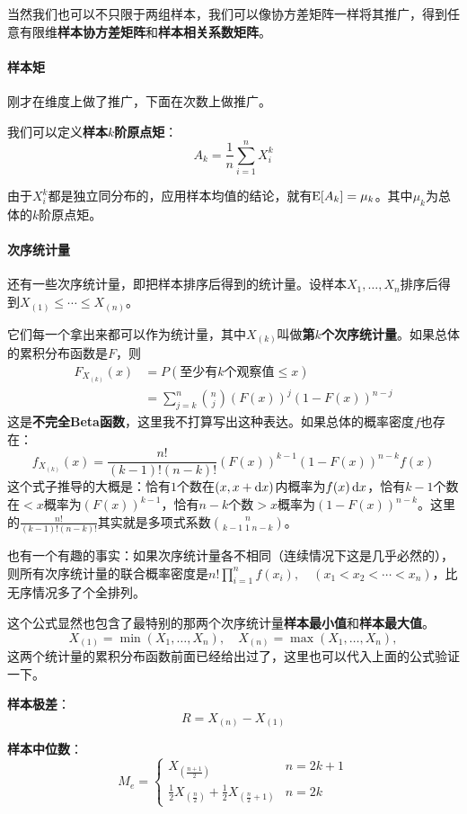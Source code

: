 当然我们也可以不只限于两组样本，我们可以像协方差矩阵一样将其推广，得到任意有限维\textbf{样本协方差矩阵}和\textbf{样本相关系数矩阵}。

\paragraph{样本矩}
刚才在维度上做了推广，下面在次数上做推广。

我们可以定义\textbf{样本$k$阶原点矩}：
\[
A_k=\frac{1}{n}\sum_{i=1}^nX_i^k
\]

由于$X_i^k$都是独立同分布的，应用样本均值的结论，就有$\operatorname{E}[A_k]=\mu_k$。其中$\mu_k$为总体的$k$阶原点矩。

\paragraph{次序统计量}
还有一些次序统计量，即把样本排序后得到的统计量。设样本$X_1,\ldots,X_n$排序后得到$X_{(1)}\leq \cdots \leq X_{(n)}$。

它们每一个拿出来都可以作为统计量，其中$X_{(k)}$叫做\textbf{第$k$个次序统计量}。如果总体的累积分布函数是$F$，则
\begin{align*}
F_{X_{(k)}}(x) &= P(\text{至少有$k$个观察值$\leq x$})\\
&= \sum_{j=k}^{n} \binom{n}{j} (F(x))^j(1-F(x))^{n-j}
\end{align*}
这是\textbf{不完全Beta函数}，这里我不打算写出这种表达。如果总体的概率密度$f$也存在：
\[
f_{X_{(k)}}(x) = \frac{n!}{(k-1)!(n-k)!}(F(x))^{k-1}(1-F(x))^{n-k}f(x)
\]
这个式子推导的大概是：恰有$1$个数在$(x,x+\mathop{}\!\mathrm{d} x)$内概率为$f(x)\mathop{}\!\mathrm{d} x$，恰有$k-1$个数在$<x$概率为$(F(x))^{k-1}$，恰有$n-k$个数$>x$概率为$(1-F(x))^{n-k}$。这里的$\frac{n!}{(k-1)!(n-k)!}$其实就是多项式系数$\binom{n}{k-1\;1\;n-k}$。

也有一个有趣的事实：如果次序统计量各不相同（连续情况下这是几乎必然的），则所有次序统计量的联合概率密度是$n!\prod_{i=1}^nf(x_i),\quad (x_1<x_2<\cdots< x_n)$，比无序情况多了个全排列。

这个公式显然也包含了最特别的那两个次序统计量\textbf{样本最小值}和\textbf{样本最大值}。
\[
X_{(1)} = \min(X_1,\ldots,X_n),\quad X_{(n)} = \max(X_1,\ldots,X_n),
\]
这两个统计量的累积分布函数前面已经给出过了，这里也可以代入上面的公式验证一下。

\textbf{样本极差}：
\[
R=X_{(n)}-X_{(1)}
\]

\textbf{样本中位数}：
\[
M_e=\begin{cases}
    X_{(\frac{n+1}{2})} & n=2k+1\\
    \frac 12 X_{(\frac{n}{2})} + \frac 12 X_{(\frac{n}{2}+1)} & n=2k
\end{cases}
\]

